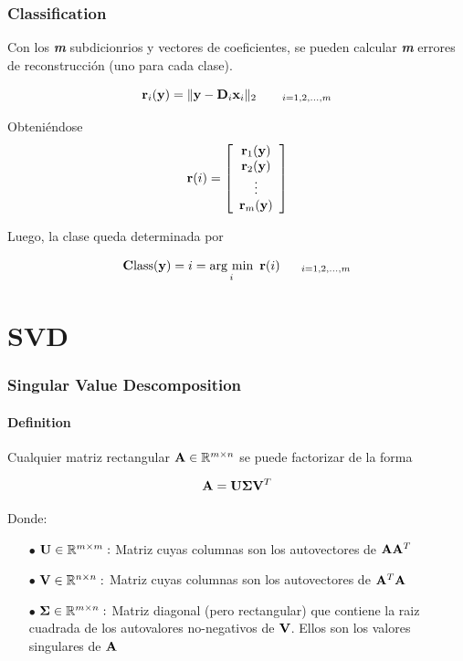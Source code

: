 \documentclass[spanish,xcolor=dvipsnames]{beamer}
\DeclareMathOperator*{\argmin}{arg\ min}
\begin{document}
\begin {frame}
	\frametitle{Classification}

Con los \textit {\textbf{m}} subdicionrios y vectores de coeficientes, se pueden calcular \textit {\textbf{m}} errores de reconstrucción (uno para cada clase).

	\begin{equation}
		\nonumber {\bf r}_i ({\bf y}) = \| {\bf y} - {\bf D}_i{\bf x}_i \|_2 \  \; \; \; \; \; \; {}_{i=1,2,\ldots, m}
	\end {equation}

Obteniéndose
	\begin{equation}
		\nonumber {\bf r} (i) = \left[ \begin{array}{c} {\bf r}_1 ({\bf y}) \\ {\bf r}_2 ({\bf y}) \\ \vdots \\ {\bf r}_m ({\bf y}) \end{array} \right] 
	\end {equation}

Luego, la clase queda determinada por

	\begin{equation}
		\nonumber {\bf C} \textnormal{lass} ({\bf y}) = i = \argmin_i \ {{\bf r} (i)}  \; \; \; \; \; \;  {}_{i=1,2,\ldots, m}
	\end{equation}
		
\end {frame}

\section {SVD}
\begin{frame}
	\frametitle{Singular Value Descomposition}
	\framesubtitle{Definition}
		
Cualquier matriz rectangular ${\bf A} \in \mathbb{R}^{m \times n}$ se puede factorizar de la forma

	\begin{equation}
		\nonumber {\bf A}={\bf U} {\bf \Sigma} {\bf V}^T
	\end{equation}

Donde:

	\begin{itemize}
		\item[\color{black}  \bf $\bullet$] ${\bf U} \in \mathbb{R}^{m \times m}:$ Matriz cuyas columnas son los autovectores de ${\bf A}{\bf A}^T$ 
		\item[\color{black}  \bf $\bullet$] ${\bf V} \in \mathbb{R}^{n \times n}:$ Matriz cuyas columnas son los autovectores de ${\bf A}^T{\bf A}$
		\item[\color{black}  \bf $\bullet$] ${\bf \Sigma} \in \mathbb{R}^{m \times n}:$ Matriz diagonal (pero rectangular) que contiene la raiz cuadrada de los autovalores no-negativos de ${\bf V}$. \newline Ellos son los valores singulares de ${\bf A}$
	\end{itemize}
\end{frame}	
\end{document}
